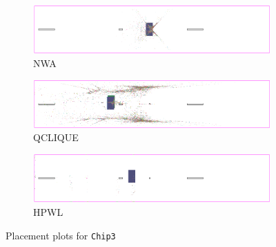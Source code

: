 \begin{figure}[p]
 \centering

 \begin{subfigure}{\textwidth}
  \includegraphics[width=\textwidth]{hpwl_qclique_comparisons/placement_Chip3_NWA.png}
  \caption{NWA}
 \end{subfigure}
 
 \bigskip
 
 \begin{subfigure}{\textwidth}
  \includegraphics[width=\textwidth]{hpwl_qclique_comparisons/placement_Chip3_QCLIQUE.png}
  \caption{QCLIQUE}
 \end{subfigure}
 
 \bigskip
 
 \begin{subfigure}{\textwidth}
  \includegraphics[width=\textwidth]{hpwl_qclique_comparisons/placement_Chip3_HPWL.png}
  \caption{HPWL}
 \end{subfigure}

 \caption{Placement plots for \texttt{Chip3}}
 \label{fig:placement_Chip3_depending_on_objective_function}
\end{figure}

